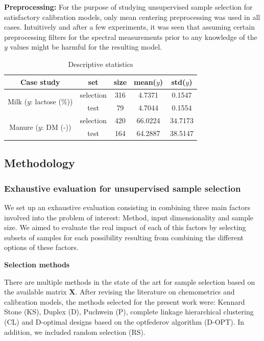 \documentclass{article}
\begin{document}
\textbf{Preprocessing:} For the purpose of studying unsupervised sample selection for satisfactory calibration models, only mean centering preprocessing was used in all cases. Intuitively and after a few experiments, it was seen that assuming certain preprocessing filters for the spectral measurements prior to any knowledge of the $y$ values might be harmful for the resulting model.

\begin{table}[t]
\centering
\begin{tabular}{|c|c|c|c|c|} 
\hline
Case study	& set & size & mean($y$) & std($y$)  	\\
\hline
\multirow{2}{10em}{Milk ($y$: lactose (\%))} & selection & 316 & 4.7371 & 0.1547\\
& test & 79 & 4.7044 & 0.1554\\
\hline
\multirow{2}{10em}{Manure ($y$: DM (-))} & selection & 420 & 66.0224 & 34.7173\\
& test & 164 & 64.2887 & 38.5147 \\
\hline 


\end{tabular}
\caption{Descriptive statistics}
\label{tab_descriptive_statistics}
\end{table}

\subsection*{Methodology}\label{methodology}

\subsubsection*{Exhaustive evaluation for unsupervised sample selection}

We set up an exhaustive evaluation consisting in combining three main factors involved into the problem of interest: Method, input dimensionality and sample size. We aimed to evaluate the real impact of each of this factors by selecting subsets of samples for each possibility resulting from combining the different options of these factors.  

\textbf{Selection methods}

There are multiple methods in the state of the art for sample selection based on the available matrix $\mathbf{X}$. After revising the literature on chemometrics and calibration models, the methods selected for the present work were: Kennard Stone (KS), Duplex (D), Puchwein (P), complete linkage hierarchical clustering (CL) and D-optimal designs based on the optfederov algorithm (D-OPT). In addition, we included random selection (RS). 
\end{document}
